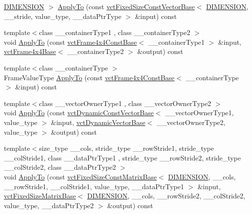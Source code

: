 \begin{DoxyCompactItemize}
\hyperlink{classvct_frame4x4_const_base_aa9000d4539e9ab27b091692d4bd0d986a97d7212e6c46dc9acbbd11bbc573d9a0}{D\-I\-M\-E\-N\-S\-I\-O\-N} $>$ \hyperlink{classvct_frame4x4_const_base_a8767522d9f97256a849b53bdd083ce18}{Apply\-To} (const \hyperlink{classvct_fixed_size_const_vector_base}{vct\-Fixed\-Size\-Const\-Vector\-Base}$<$ \hyperlink{classvct_frame4x4_const_base_aa9000d4539e9ab27b091692d4bd0d986a97d7212e6c46dc9acbbd11bbc573d9a0}{D\-I\-M\-E\-N\-S\-I\-O\-N}, \-\_\-\-\_\-stride, value\-\_\-type, \-\_\-\-\_\-data\-Ptr\-Type $>$ \&input) const 
\item 
{\footnotesize template$<$class \-\_\-\-\_\-container\-Type1 , class \-\_\-\-\_\-container\-Type2 $>$ }\\void \hyperlink{classvct_frame4x4_const_base_a986730ca3c96736d8e6ce42067836fbf}{Apply\-To} (const \hyperlink{classvct_frame4x4_const_base}{vct\-Frame4x4\-Const\-Base}$<$ \-\_\-\-\_\-container\-Type1 $>$ \&input, \hyperlink{classvct_frame4x4_base}{vct\-Frame4x4\-Base}$<$ \-\_\-\-\_\-container\-Type2 $>$ \&output) const 
\item 
{\footnotesize template$<$class \-\_\-\-\_\-container\-Type $>$ }\\Frame\-Value\-Type \hyperlink{classvct_frame4x4_const_base_a962239489fa268ef59bc03becc68ca33}{Apply\-To} (const \hyperlink{classvct_frame4x4_const_base}{vct\-Frame4x4\-Const\-Base}$<$ \-\_\-\-\_\-container\-Type $>$ \&input) const 
\item 
{\footnotesize template$<$class \-\_\-\-\_\-vector\-Owner\-Type1 , class \-\_\-\-\_\-vector\-Owner\-Type2 $>$ }\\void \hyperlink{classvct_frame4x4_const_base_a57baebdab20bbaa46bc29aaad1cecff1}{Apply\-To} (const \hyperlink{classvct_dynamic_const_vector_base}{vct\-Dynamic\-Const\-Vector\-Base}$<$ \-\_\-\-\_\-vector\-Owner\-Type1, value\-\_\-type $>$ \&input, \hyperlink{classvct_dynamic_vector_base}{vct\-Dynamic\-Vector\-Base}$<$ \-\_\-\-\_\-vector\-Owner\-Type2, value\-\_\-type $>$ \&output) const 
\item 
{\footnotesize template$<$size\-\_\-type \-\_\-\-\_\-cols, stride\-\_\-type \-\_\-\-\_\-row\-Stride1, stride\-\_\-type \-\_\-\-\_\-col\-Stride1, class \-\_\-\-\_\-data\-Ptr\-Type1 , stride\-\_\-type \-\_\-\-\_\-row\-Stride2, stride\-\_\-type \-\_\-\-\_\-col\-Stride2, class \-\_\-\-\_\-data\-Ptr\-Type2 $>$ }\\void \hyperlink{classvct_frame4x4_const_base_a531221401fe4915c612f603b16d823ea}{Apply\-To} (const \hyperlink{classvct_fixed_size_const_matrix_base}{vct\-Fixed\-Size\-Const\-Matrix\-Base}$<$ \hyperlink{classvct_frame4x4_const_base_aa9000d4539e9ab27b091692d4bd0d986a97d7212e6c46dc9acbbd11bbc573d9a0}{D\-I\-M\-E\-N\-S\-I\-O\-N}, \-\_\-\-\_\-cols, \-\_\-\-\_\-row\-Stride1, \-\_\-\-\_\-col\-Stride1, value\-\_\-type, \-\_\-\-\_\-data\-Ptr\-Type1 $>$ \&input, \hyperlink{classvct_fixed_size_matrix_base}{vct\-Fixed\-Size\-Matrix\-Base}$<$ \hyperlink{classvct_frame4x4_const_base_aa9000d4539e9ab27b091692d4bd0d986a97d7212e6c46dc9acbbd11bbc573d9a0}{D\-I\-M\-E\-N\-S\-I\-O\-N}, \-\_\-\-\_\-cols, \-\_\-\-\_\-row\-Stride2, \-\_\-\-\_\-col\-Stride2, value\-\_\-type, \-\_\-\-\_\-data\-Ptr\-Type2 $>$ \&output) const 

\end{DoxyCompactItemize}
